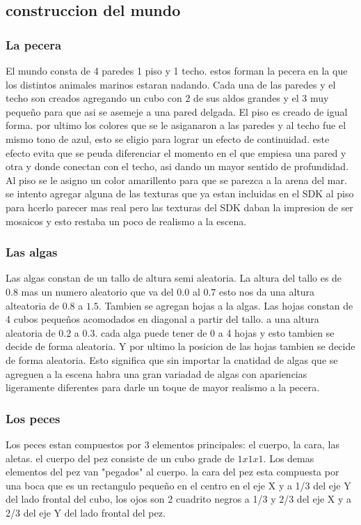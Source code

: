 \documentclass[10pt, a4paper, twocolumn]{article}
\begin{document}
\subsection{construccion del mundo}
\subsubsection{La pecera}

El mundo consta de 4 paredes 1 piso y 1 techo. estos forman la pecera en la que los distintos animales marinos estaran nadando.
Cada una de las paredes y el techo son creados agregando un cubo con 2 de sus aldos grandes y el 3 muy pequeño para que asi se asemeje a una pared delgada. El piso es creado de igual forma. por ultimo los colores que se le asiganaron a las paredes y al techo fue el mismo tono de azul, esto se eligio para lograr un efecto de continuidad. este efecto evita que se peuda diferenciar el momento en el que empiesa una pared y otra y donde conectan con el techo, asi dando un mayor sentido de profundidad.
Al piso se le asigno un color amarillento para que se parezca a la arena del mar. 
se intento agregar alguna de las texturas que ya estan incluidas en el SDK al piso para hcerlo parecer mas real pero las texturas del SDK daban la impresion de ser mosaicos y esto restaba un poco de realismo a la escena.  

\subsubsection{Las algas}
Las algas constan de un tallo de altura semi aleatoria. La altura del tallo es de 0.8 mas un numero aleatorio que va del $0.0$ al $0.7$ esto nos da una altura alteatoria de $0.8$ a $1.5$. Tambien se agregan hojas a la algas. Las hojas constan de 4 cubos pequeños acomodados en diagonal a partir del tallo. a una altura aleatoria de $0.2$ a $0.3$. cada alga puede tener de 0 a 4 hojas y esto tambien se decide de forma aleatoria. Y por ultimo la posicion de las hojas tambien se decide de forma aleatoria. Esto significa que sin importar la cnatidad de algas que se agreguen a la escena habra una gran variadad de algas con apariencias ligeramente diferentes para darle un toque de mayor realismo a la pecera.

\subsubsection{Los peces}
Los peces estan compuestos por 3 elementos principales: el cuerpo, la cara, las aletas. el cuerpo del pez consiste de un cubo grade de $1x1x1$. Los demas elementos del pez van "pegados" al cuerpo. la cara del pez esta compuesta por una boca que es un rectangulo pequeño en el centro en el eje X y a 1/3 del eje Y del lado frontal del cubo, los ojos son 2 cuadrito negros a 1/3 y 2/3 del eje X y a 2/3 del eje Y del lado frontal del pez. 
\end{document}
